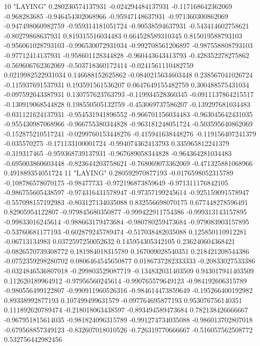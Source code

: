 10 "LAYING" 0.280230574137931 -0.024294484137931 -0.117168642362069 -0.968283685 -0.946454302068966 -0.95947148637931 -0.971360300862069 -0.947498060982759 -0.959314181051724 -0.90538594637931 -0.543414602758621 -0.80279868637931 0.819315516034483 0.664528589310345 0.815019588793103 -0.956061028793103 -0.996530072931034 -0.992708561206897 -0.987558808793103 -0.97712414137931 -0.958601128344828 -0.960443643413793 -0.428352278275862 -0.569606762362069 -0.503718360172414 -0.0241561110482759 0.0219982522931034 0.146688152625862 -0.0840215634603448 0.238567041026724 -0.115937691537931 0.193591561536207 0.0647649155482759 0.300488575431034 -0.097592643387931 0.130757623763793 -0.119934528360345 -0.0911137864215517 -0.130919068544828 0.198550505132759 -0.453069737586207 -0.139297681034483 -0.031121624137931 -0.954531941896552 -0.966701156034483 -0.963045642431035 -0.955430987068966 -0.966755380344828 -0.963181248051724 -0.503595640862069 -0.152875210517241 -0.0299760153448276 -0.415941638448276 -0.119156407241379 -0.035570275 -0.171133100001724 -0.994074362413793 0.335965812241379 -0.319317465 -0.959368739137931 -0.967689058344828 -0.964364281034483 -0.695003860603448 -0.823644203758621 -0.768069073362069 -0.471325881068966 0.491889354051724
11 "LAYING" 0.280592970877193 -0.0176598052315789 -0.108786578070175 -0.98477733 -0.972196873859649 -0.971311176842105 -0.986755605438597 -0.974316431578947 -0.97357199245614 -0.925159091578947 -0.557098157192983 -0.803127134035088 0.832556698070175 0.677448278596491 0.82905954122807 -0.979845680350877 -0.999422911754386 -0.999313143157895 -0.99833016245614 -0.988663179473684 -0.980780259473684 -0.979083903157895 -0.53760681177193 -0.602879245789474 -0.517038482035088 0.125850110912281 -0.06713134983 0.0372597250052632 0.145954305342105 0.236240604368421 -0.0826570739308772 0.181984018315789 0.167009028540351 0.218421208544386 -0.0752359298280702 0.0806464545650877 0.0186737282333333 -0.20833027533386 -0.0324846536807018 -0.299803529087719 -0.134832031403509 0.943017941403509 0.112620189964912 -0.97956560245614 -0.990765579649123 -0.984192606315789 -0.980556499122807 -0.990911960526316 -0.984614473859649 -0.195266400192982 0.89338992877193 0.107499499631579 -0.097764695877193 0.953076756140351 0.111892620789474 -0.218018063438597 -0.893494589473684 0.782138426666667 -0.967951815614035 -0.981824096315789 -0.991274734035088 -0.986013702807018 -0.679568857349123 -0.832607018010526 -0.726319770666667 -0.516057562508772 0.532756442982456
